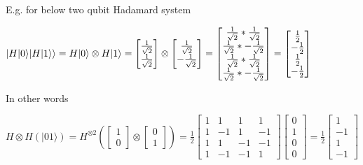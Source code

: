 \documentclass[11pt, fleqn]{article}
\begin{document}
E.g. for below two qubit Hadamard system

$|H|0\rangle |H|1\rangle\rangle =
H|0\rangle \otimes H|1\rangle =
\begin{bmatrix}\frac{1}{\sqrt 2}\\\frac{1}{\sqrt 2}\end{bmatrix} \otimes
\begin{bmatrix}\frac{1}{\sqrt 2}\\-\frac{1}{\sqrt 2}\end{bmatrix} =
\begin{bmatrix}\frac{1}{\sqrt 2}*\frac{1}{\sqrt 2}\\
\frac{1}{\sqrt 2}*-\frac{1}{\sqrt 2}\\
\frac{1}{\sqrt 2}*\frac{1}{\sqrt 2}\\
\frac{1}{\sqrt 2}*-\frac{1}{\sqrt 2}\end{bmatrix}=
\begin{bmatrix}\frac{1}{2}\\
-\frac{1}{2}\\
\frac{1}{2}\\
-\frac{1}{2}\end{bmatrix}
\\~\\$

In other words

$H\otimes H(|01\rangle) =
H^{\otimes 2} \left( \begin{bmatrix}1 \\ 0 \end{bmatrix}\otimes \begin{bmatrix}0\\1 \end{bmatrix} \right) =
\frac{1}{2}\begin{bmatrix}1 &1 &1 &1 \\ 1 &-1 &1 &-1 \\ 1 &1 &-1 &-1 \\ 1 &-1 &-1 &1 \end{bmatrix}\begin{bmatrix}0\\ 1\\ 0\\ 0\end{bmatrix} =
\frac{1}{2}\begin{bmatrix}1\\ -1\\ 1\\ -1\end{bmatrix}$
\end{document}
